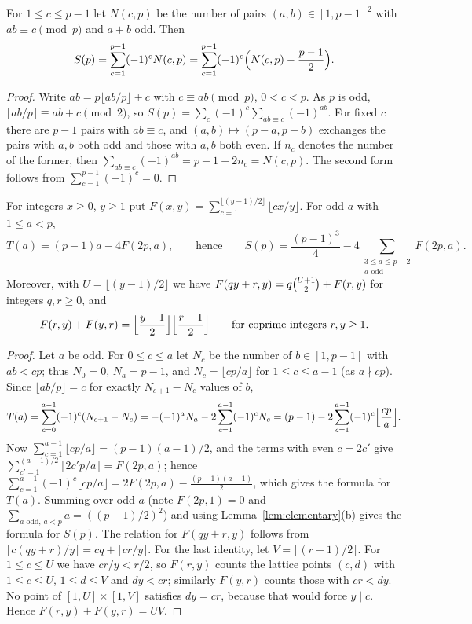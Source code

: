 \begin{lemma}\label{lem:lehmer}
For $1\le c\le p-1$ let $N(c,p)$ be the number of pairs $(a,b)\in[1,p-1]^2$ with $ab\equiv c\pmod p$ and $a+b$ odd. Then
\[
S(p)=\sum_{c=1}^{p-1}(-1)^cN(c,p)=\sum_{c=1}^{p-1}(-1)^c\Bigl(N(c,p)-\frac{p-1}2\Bigr).
\]
\end{lemma}

\begin{proof}
Write $ab=p\lfloor ab/p\rfloor+c$ with $c\equiv ab\pmod p$, $0<c<p$. As $p$ is odd, $\lfloor ab/p\rfloor\equiv ab+c\pmod2$, so $S(p)=\sum_c(-1)^c\sum_{ab\equiv c}(-1)^{ab}$. For fixed $c$ there are $p-1$ pairs with $ab\equiv c$, and $(a,b)\mapsto(p-a,p-b)$ exchanges the pairs with $a,b$ both odd and those with $a,b$ both even. If $n_c$ denotes the number of the former, then $\sum_{ab\equiv c}(-1)^{ab}=p-1-2n_c=N(c,p)$. The second form follows from $\sum_{c=1}^{p-1}(-1)^c=0$.
\end{proof}

\begin{lemma}\label{lem:counting}
For integers $x\ge0$, $y\ge1$ put $F(x,y)=\sum_{c=1}^{\lfloor(y-1)/2\rfloor}\lfloor cx/y\rfloor$. For odd $a$ with $1\le a<p$,
\[
T(a)=(p-1)a-4F(2p,a),\qquad\text{hence}\qquad S(p)=\frac{(p-1)^3}4-4\sum_{\substack{3\le a\le p-2\\ a\text{ odd}}}F(2p,a).
\]
Moreover, with $U=\lfloor(y-1)/2\rfloor$ we have $F(qy+r,y)=q\tbinom{U+1}2+F(r,y)$ for integers $q,r\ge0$, and
\[
F(r,y)+F(y,r)=\Bigl\lfloor\frac{y-1}2\Bigr\rfloor\Bigl\lfloor\frac{r-1}2\Bigr\rfloor\qquad\text{for coprime integers }r,y\ge1.
\]
\end{lemma}

\begin{proof}
Let $a$ be odd. For $0\le c\le a$ let $N_c$ be the number of $b\in[1,p-1]$ with $ab<cp$; thus $N_0=0$, $N_a=p-1$, and $N_c=\lfloor cp/a\rfloor$ for $1\le c\le a-1$ (as $a\nmid cp$). Since $\lfloor ab/p\rfloor=c$ for exactly $N_{c+1}-N_c$ values of $b$,
\[
T(a)=\sum_{c=0}^{a-1}(-1)^c(N_{c+1}-N_c)=-(-1)^aN_a-2\sum_{c=1}^{a-1}(-1)^cN_c=(p-1)-2\sum_{c=1}^{a-1}(-1)^c\Bigl\lfloor\frac{cp}a\Bigr\rfloor.
\]
Now $\sum_{c=1}^{a-1}\lfloor cp/a\rfloor=(p-1)(a-1)/2$, and the terms with even $c=2c'$ give $\sum_{c'=1}^{(a-1)/2}\lfloor2c'p/a\rfloor=F(2p,a)$; hence $\sum_{c=1}^{a-1}(-1)^c\lfloor cp/a\rfloor=2F(2p,a)-\frac{(p-1)(a-1)}2$, which gives the formula for $T(a)$. Summing over odd $a$ (note $F(2p,1)=0$ and $\sum_{a\text{ odd},\,a<p}a=((p-1)/2)^2$) and using Lemma~\ref{lem:elementary}(b) gives the formula for $S(p)$. The relation for $F(qy+r,y)$ follows from $\lfloor c(qy+r)/y\rfloor=cq+\lfloor cr/y\rfloor$. For the last identity, let $V=\lfloor(r-1)/2\rfloor$. For $1\le c\le U$ we have $cr/y<r/2$, so $F(r,y)$ counts the lattice points $(c,d)$ with $1\le c\le U$, $1\le d\le V$ and $dy<cr$; similarly $F(y,r)$ counts those with $cr<dy$. No point of $[1,U]\times[1,V]$ satisfies $dy=cr$, because that would force $y\mid c$. Hence $F(r,y)+F(y,r)=UV$.
\end{proof}

